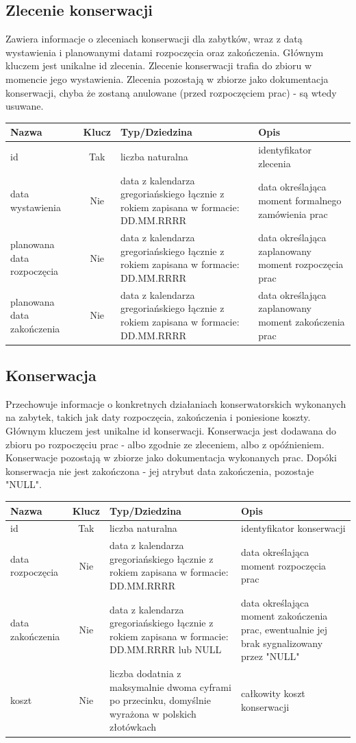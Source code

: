\documentclass{article}
\begin{document}
\subsection*{Zlecenie konserwacji}
Zawiera informacje o zleceniach konserwacji dla zabytków, wraz z datą wystawienia i planowanymi datami rozpoczęcia oraz zakończenia. Głównym kluczem jest unikalne id zlecenia. Zlecenie konserwacji trafia do zbioru w momencie jego wystawienia. Zlecenia pozostają w zbiorze jako dokumentacja konserwacji, chyba że zostaną anulowane (przed rozpoczęciem prac) - są wtedy usuwane.  
\begin{longtable}{|C{3cm}|c|C{4.5cm}|C{5cm}|}
\hline
\textbf{Nazwa} & \textbf{Klucz} & \textbf{Typ/Dziedzina} & \textbf{Opis} \\ \hline
id & Tak & liczba naturalna & identyfikator zlecenia \\ \hline 
data wystawienia & Nie & data z kalendarza gregoriańskiego łącznie z rokiem zapisana w formacie: DD.MM.RRRR  & data określająca moment formalnego zamówienia prac \\ \hline 
planowana data rozpoczęcia & Nie & data z kalendarza gregoriańskiego łącznie z rokiem zapisana w formacie: DD.MM.RRRR  & data określająca zaplanowany moment rozpoczęcia prac \\ \hline
planowana data zakończenia & Nie & data z kalendarza gregoriańskiego łącznie z rokiem zapisana w formacie: DD.MM.RRRR  & data określająca zaplanowany moment zakończenia prac \\ \hline
\end{longtable}

\subsection*{Konserwacja}
Przechowuje informacje o konkretnych działaniach konserwatorskich wykonanych na zabytek, takich jak daty rozpoczęcia, zakończenia i poniesione koszty. Głównym kluczem jest unikalne id konserwacji. Konserwacja jest dodawana do zbioru po rozpoczęciu prac - albo zgodnie ze zleceniem, albo z opóźnieniem. Konserwacje pozostają w zbiorze jako dokumentacja wykonanych prac. Dopóki konserwacja nie jest zakończona - jej atrybut data zakończenia, pozostaje "NULL".  
\begin{longtable}{|C{3cm}|c|C{4.5cm}|C{5cm}|}
\hline
\textbf{Nazwa} & \textbf{Klucz} & \textbf{Typ/Dziedzina} & \textbf{Opis} \\ \hline
id & Tak & liczba naturalna & identyfikator konserwacji \\ \hline 
data rozpoczęcia & Nie & data z kalendarza gregoriańskiego łącznie z rokiem zapisana w formacie: DD.MM.RRRR & data określająca moment rozpoczęcia prac \\ \hline 
data zakończenia & Nie & data z kalendarza gregoriańskiego łącznie z rokiem zapisana w formacie: DD.MM.RRRR lub NULL & data określająca moment zakończenia prac, ewentualnie jej brak sygnalizowany przez "NULL" \\ \hline
koszt & Nie & liczba dodatnia z maksymalnie dwoma cyframi po przecinku, domyślnie wyrażona w polskich złotówkach & całkowity koszt konserwacji \\ \hline
\end{longtable}
\end{document}
